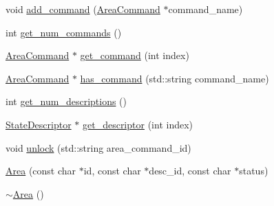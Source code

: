 \begin{DoxyCompactItemize}
\item 
void \hyperlink{class_area_a61f8a73da43dbfa8259a308cb61a28f0}{add\-\_\-command} (\hyperlink{class_area_command}{\-Area\-Command} $\ast$command\-\_\-name)
\item 
int \hyperlink{class_area_a4ba46fedbf3da57ca8bc6de3f50de0a4}{get\-\_\-num\-\_\-commands} ()
\item 
\hyperlink{class_area_command}{\-Area\-Command} $\ast$ \hyperlink{class_area_ae7ee0c8526f4b18b9aca41faf7570e8d}{get\-\_\-command} (int index)
\item 
\hyperlink{class_area_command}{\-Area\-Command} $\ast$ \hyperlink{class_area_a7ed668f761ab79669ad6fb23419b22b2}{has\-\_\-command} (std\-::string command\-\_\-name)
\item 
int \hyperlink{class_area_a917fe473912d321f631be8e1b30e5edf}{get\-\_\-num\-\_\-descriptions} ()
\item 
\hyperlink{class_state_descriptor}{\-State\-Descriptor} $\ast$ \hyperlink{class_area_a94b7cf6ce69e92cddbd4a2a4ec92fbfd}{get\-\_\-descriptor} (int index)
\item 
void \hyperlink{class_area_a6e38f449666617680d0aee968c5c9f57}{unlock} (std\-::string area\-\_\-command\-\_\-id)
\item 
\hyperlink{class_area_afa6f67fe88559c8dbc5fbd1fbc73d8a2}{\-Area} (const char $\ast$id, const char $\ast$desc\-\_\-id, const char $\ast$status)
\item 
\hyperlink{class_area_ace0975982b61a16746c564a0d43a4cc8}{$\sim$\-Area} ()
\end{DoxyCompactItemize}
